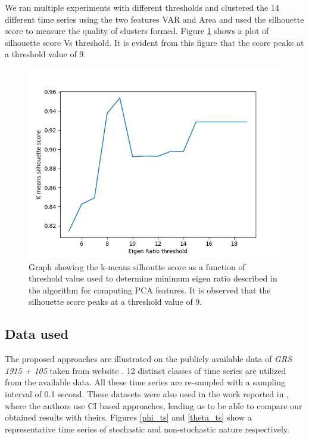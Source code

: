 \documentclass[10pt,conference]{IEEEtran}
\begin{document}
We ran multiple experiments with different thresholds and clustered the 14 different time series using the two features VAR and Area and used the silhouette score to measure the quality of clusters formed. Figure \ref{fig:threshold_vs_silhoutte_score} shows a plot of silhouette score Vs threshold. It is evident from this figure that the score peaks at a threshold value of 9.
\begin{figure}[ht]
\centering
\includegraphics[width=0.8\linewidth]{images/threshold_vs_silhoutte_score.jpg}
\caption{Graph showing the k-means silhoutte score as a function of threshold value used to determine minimum eigen ratio described in the algorithm for computing PCA features. It is observed that the silhouette score peaks at a threshold value of 9. }
\label{fig:threshold_vs_silhoutte_score}
\end{figure}

\subsection{Data used}
The proposed approaches are illustrated on the publicly available data of \textit{GRS 1915 + 105} taken from website \cite{xte}. 12 distinct classes of time series are utilized from the available data. All these time series are re-sampled with a sampling interval of 0.1 second. These datasets  were  also used in the work reported in \cite{Adegoke2018}, where the authors use CI based approaches, leading us to be able to compare our obtained results with theirs. Figures \ref{phi_ts} and \ref{theta_ts} show a representative time series of stochastic and non-stochastic  nature respectively.
\end{document}
